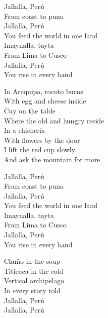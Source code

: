 \begin{lyrics}
Jallalla, Perú\\
From coast to puna\\
Jallalla, Perú\\
You feed the world in one land\\
Imaynalla, tayta\\
From Lima to Cusco\\
Jallalla, Perú\\
You rise in every hand

In Arequipa, rocoto burns\\
With egg and cheese inside\\
Cuy on the table\\
Where the old and hungry reside\\
In a chichería\\
With flowers by the door\\
I lift the red cup slowly\\
And ask the mountain for more

Jallalla, Perú\\
From coast to puna\\
Jallalla, Perú\\
You feed the world in one land\\
Imaynalla, tayta\\
From Lima to Cusco\\
Jallalla, Perú\\
You rise in every hand

Chuño in the soup\\
Titicaca in the cold\\
Vertical archipelago\\
In every story told\\
Jallalla, Perú\\
Jallalla, Perú
\end{lyrics}

